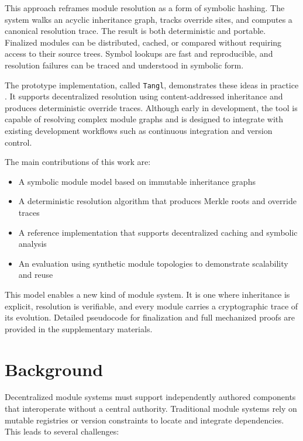 \documentclass[sigplan,screen]{acmart}
\begin{document}
This approach reframes module resolution as a form of symbolic hashing. The system walks an acyclic inheritance graph, tracks override sites, and computes a canonical resolution trace. The result is both deterministic and portable. Finalized modules can be distributed, cached, or compared without requiring access to their source trees. Symbol lookups are fast and reproducible, and resolution failures can be traced and understood in symbolic form.

The prototype implementation, called \texttt{Tangl}, demonstrates these ideas in practice \cite{tangl}. It supports decentralized resolution using content-addressed inheritance and produces deterministic override traces. Although early in development, the tool is capable of resolving complex module graphs and is designed to integrate with existing development workflows such as continuous integration and version control.

The main contributions of this work are:

\begin{itemize}
	\item A symbolic module model based on immutable inheritance graphs
	\item A deterministic resolution algorithm that produces Merkle roots and override traces
	\item A reference implementation that supports decentralized caching and symbolic analysis
	\item An evaluation using synthetic module topologies to demonstrate scalability and reuse
\end{itemize}

This model enables a new kind of module system. It is one where inheritance is explicit, resolution is verifiable, and every module carries a cryptographic trace of its evolution. Detailed pseudocode for finalization and full mechanized proofs are provided in the supplementary materials.

\section{Background}
\label{sec:background}

Decentralized module systems must support independently authored components that interoperate without a central authority. Traditional module systems rely on mutable registries or version constraints to locate and integrate dependencies. This leads to several challenges:
\end{document}

